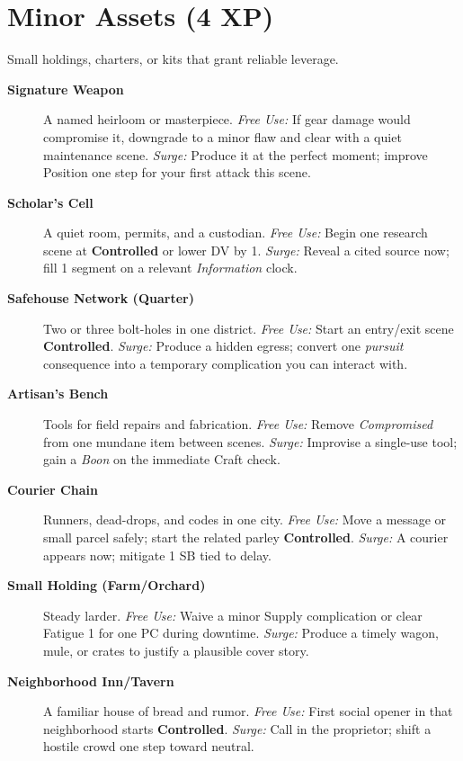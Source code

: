 \section{Minor Assets (4 XP)}
Small holdings, charters, or kits that grant reliable leverage.
\begin{description}
  \item[\textbf{Signature Weapon}]  A named heirloom or masterpiece. \emph{Free Use:} If gear damage would compromise it, downgrade to a minor flaw and clear with a quiet maintenance scene. \emph{Surge:} Produce it at the perfect moment; improve Position one step for your first attack this scene.
  \item[\textbf{Scholar's Cell}]  A quiet room, permits, and a custodian. \emph{Free Use:} Begin one research scene at \textbf{Controlled} or lower DV by 1. \emph{Surge:} Reveal a cited source now; fill 1 segment on a relevant \emph{Information} clock.
  \item[\textbf{Safehouse Network (Quarter)}]  Two or three bolt-holes in one district. \emph{Free Use:} Start an entry/exit scene \textbf{Controlled}. \emph{Surge:} Produce a hidden egress; convert one \emph{pursuit} consequence into a temporary complication you can interact with.
  \item[\textbf{Artisan's Bench}]  Tools for field repairs and fabrication. \emph{Free Use:} Remove \emph{Compromised} from one mundane item between scenes. \emph{Surge:} Improvise a single-use tool; gain a \emph{Boon} on the immediate Craft check.
  \item[\textbf{Courier Chain}]  Runners, dead-drops, and codes in one city. \emph{Free Use:} Move a message or small parcel safely; start the related parley \textbf{Controlled}. \emph{Surge:} A courier appears now; mitigate 1 SB tied to delay.
  \item[\textbf{Small Holding (Farm/Orchard)}]  Steady larder. \emph{Free Use:} Waive a minor Supply complication or clear Fatigue 1 for one PC during downtime. \emph{Surge:} Produce a timely wagon, mule, or crates to justify a plausible cover story.
  \item[\textbf{Neighborhood Inn/Tavern}]  A familiar house of bread and rumor. \emph{Free Use:} First social opener in that neighborhood starts \textbf{Controlled}. \emph{Surge:} Call in the proprietor; shift a hostile crowd one step toward neutral.

\end{description}
